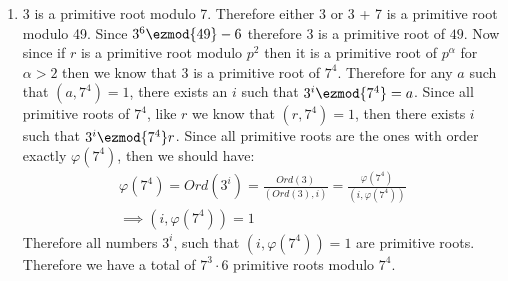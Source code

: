 \begin{enumerate}[label=]
    \item 
        3 is a primitive root modulo 7. Therefore either $3$ or 3 + 7 is a primitive root modulo 49. Since $3^6 \ezmod{49} -6$ therefore $3$ is a primitive root of $49$. Now since if $r$ is a primitive root modulo $p^2$ then it is a primitive root of $p^\alpha$ for $\alpha > 2$ then we know that $3$ is a primitive root of $7^4$. Therefore for any $a$ such that $(a, 7^4) = 1$, there exists an $i$ such that $3^i \ezmod{7^4} = a$. Since all primitive roots of $7^4$, like $r$ we know that $(r, 7^4) = 1$, then there exists $i$ such that $3^i \ezmod{7^4} r$. Since all primitive roots are the ones with order exactly $\varphi(7^4)$, then we should have:
        \begin{gather*}
            \varphi(7^4) = Ord(3^i) = \frac{Ord(3)}{(Ord(3), i)} = \frac{\varphi(7^4)}{(i, \varphi(7^4))} \\
            \implies (i, \varphi(7^4)) = 1
        \end{gather*} 
        Therefore all numbers $3^i$, such that $(i, \varphi(7^4)) = 1$ are primitive roots. Therefore we have a total of $7^3 \cdot 6$ primitive roots modulo $7^4$.
\end{enumerate}